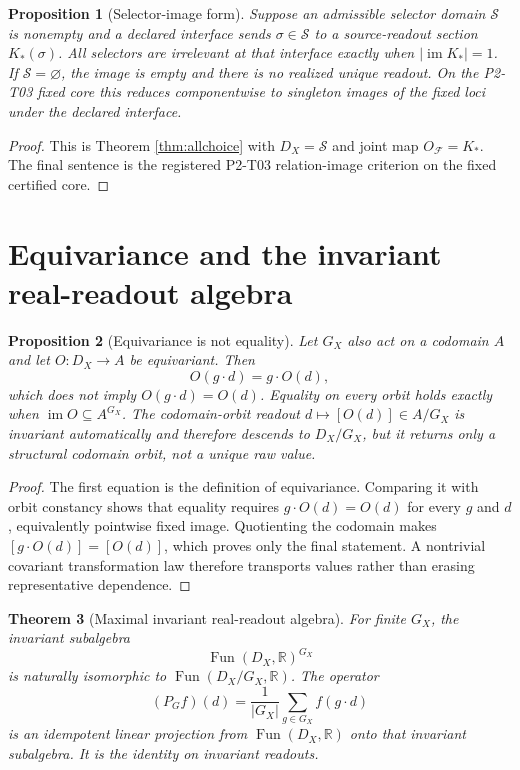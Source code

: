 \documentclass[11pt]{article}
\newtheorem{theorem}{Theorem}
\newtheorem{proposition}[theorem]{Proposition}
\theoremstyle{definition}
\newcommand{\Fun}{\operatorname{Fun}}
\newcommand{\im}{\operatorname{im}}
\begin{document}
\begin{proposition}[Selector-image form]
Suppose an admissible selector domain $\mathcal S$ is nonempty and a declared
interface sends $\sigma\in\mathcal S$ to a source-readout section $K_*(\sigma)$.
All selectors are irrelevant at that interface exactly when
$\lvert\im K_*\rvert=1$.  If $\mathcal S=\varnothing$, the image is empty and
there is no realized unique readout.  On the P2-T03 fixed core this reduces
componentwise to singleton images of the fixed loci under the declared
interface.
\end{proposition}

\begin{proof}
This is Theorem \ref{thm:allchoice} with $D_X=\mathcal S$ and joint map
$O_{\mathcal F}=K_*$.  The final sentence is the registered P2-T03
relation-image criterion on the fixed certified core.
\end{proof}

\section{Equivariance and the invariant real-readout algebra}

\begin{proposition}[Equivariance is not equality]
Let $G_X$ also act on a codomain $A$ and let $O:D_X\to A$ be equivariant.
Then
\[
  O(g\cdot d)=g\cdot O(d),
\]
which does not imply $O(g\cdot d)=O(d)$.  Equality on every orbit holds
exactly when $\im O\subseteq A^{G_X}$.  The codomain-orbit readout
$d\mapsto[O(d)]\in A/G_X$ is invariant automatically and therefore descends
to $D_X/G_X$, but it returns only a structural codomain orbit, not a unique
raw value.
\end{proposition}

\begin{proof}
The first equation is the definition of equivariance.  Comparing it with
orbit constancy shows that equality requires $g\cdot O(d)=O(d)$ for every
$g$ and $d$, equivalently pointwise fixed image.  Quotienting the codomain
makes $[g\cdot O(d)]=[O(d)]$, which proves only the final statement.  A
nontrivial covariant transformation law therefore transports values rather
than erasing representative dependence.
\end{proof}

\begin{theorem}[Maximal invariant real-readout algebra]
\label{thm:reynolds}
For finite $G_X$, the invariant subalgebra
\[
  \Fun(D_X,\mathbb R)^{G_X}
\]
is naturally isomorphic to $\Fun(D_X/G_X,\mathbb R)$.  The operator
\[
  (P_Gf)(d)=\frac{1}{|G_X|}\sum_{g\in G_X}f(g\cdot d)
\]
is an idempotent linear projection from $\Fun(D_X,\mathbb R)$ onto that
invariant subalgebra.  It is the identity on invariant readouts.
\end{theorem}
\end{document}
